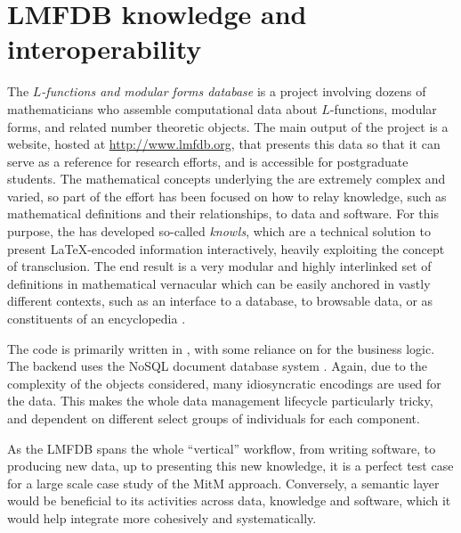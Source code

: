 \section{LMFDB knowledge and interoperability}\label{sec:lmfdb}
The \emph{$L$-functions and modular forms database} is a project involving dozens of
mathematicians who assemble computational data about $L$-functions, modular forms, and
related number theoretic objects. The main output of the project is a website, hosted at
\url{http://www.lmfdb.org}, that presents this data so that it can serve as a
reference for research efforts, and is accessible for postgraduate students.
The mathematical concepts underlying the \LMFDB are extremely complex and varied, so part
of the effort has been focused on how to relay knowledge, such as mathematical definitions
and their relationships, to data and software. For this purpose, the \LMFDB has developed so-called
\emph{knowls}, which are a technical solution to present \LaTeX-encoded information
interactively, heavily exploiting the concept of transclusion. The end result is a
very modular and highly interlinked set of definitions in mathematical vernacular
which can be easily anchored in vastly different contexts, such as an interface to a database,
to browsable data, or as constituents of an encyclopedia \cite{lmfdb-definitions}.

The \LMFDB code is primarily written in \Python, with some reliance on \Sage for
the business logic. The backend
uses the NoSQL document database system \Mongo \cite{lmfdb-repo}. Again, due to the
complexity of the objects considered, many idiosyncratic encodings are used for the
data. This makes the whole data management lifecycle particularly tricky, and dependent on
different select groups of individuals for each component.

As the LMFDB spans the whole ``vertical'' workflow, from writing software, to producing new
data, up to presenting this new knowledge, it is a perfect test case for a large scale
case study of the MitM approach. Conversely, a semantic layer would be beneficial to its
activities across data, knowledge and software, which it would help integrate more
cohesively and systematically.

